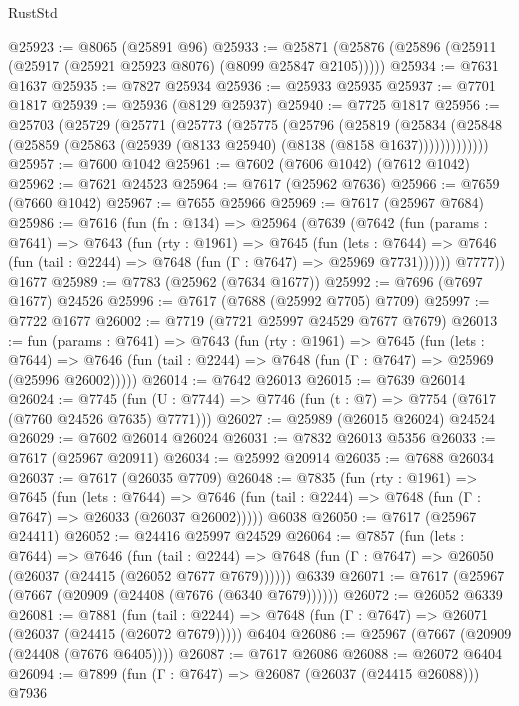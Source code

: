 \begin{lexlean}{RustStd}
\begin{coremodule}
@25923 := @8065 (@25891 @96)
@25933 := @25871 (@25876 (@25896 (@25911 (@25917 (@25921 @25923 @8076) (@8099 @25847 @2105)))))
@25934 := @7631 @1637
@25935 := @7827 @25934
@25936 := @25933 @25935
@25937 := @7701 @1817
@25939 := @25936 (@8129 @25937)
@25940 := @7725 @1817
@25956 := @25703
    (@25729
      (@25771
        (@25773
          (@25775
            (@25796
              (@25819
                (@25834
                  (@25848 (@25859 (@25863 (@25939 (@8133 @25940) (@8138 (@8158 @1637)))))))))))))
@25957 := @7600 @1042
@25961 := @7602 (@7606 @1042) (@7612 @1042)
@25962 := @7621 @24523
@25964 := @7617 (@25962 @7636)
@25966 := @7659 (@7660 @1042)
@25967 := @7655 @25966
@25969 := @7617 (@25967 @7684)
@25986 := @7616
    (fun (fn : @134) =>
    @25964
      (@7639
        (@7642
          (fun (params : @7641) =>
          @7643
            (fun (rty : @1961) =>
            @7645
              (fun (lets : @7644) =>
              @7646 (fun (tail : @2244) => @7648 (fun (Γ : @7647) => @25969 @7731))))))
        @7777))
    @1677
@25989 := @7783 (@25962 (@7634 @1677))
@25992 := @7696 (@7697 @1677) @24526
@25996 := @7617 (@7688 (@25992 @7705) @7709)
@25997 := @7722 @1677
@26002 := @7719 (@7721 @25997 @24529 @7677 @7679)
@26013 := fun (params : @7641) =>
  @7643
    (fun (rty : @1961) =>
    @7645
      (fun (lets : @7644) =>
      @7646 (fun (tail : @2244) => @7648 (fun (Γ : @7647) => @25969 (@25996 @26002)))))
@26014 := @7642 @26013
@26015 := @7639 @26014
@26024 := @7745
    (fun (U : @7744) => @7746 (fun (t : @7) => @7754 (@7617 (@7760 @24526 @7635) @7771)))
@26027 := @25989 (@26015 @26024) @24524
@26029 := @7602 @26014 @26024
@26031 := @7832 @26013 @5356
@26033 := @7617 (@25967 @20911)
@26034 := @25992 @20914
@26035 := @7688 @26034
@26037 := @7617 (@26035 @7709)
@26048 := @7835
    (fun (rty : @1961) =>
    @7645
      (fun (lets : @7644) =>
      @7646 (fun (tail : @2244) => @7648 (fun (Γ : @7647) => @26033 (@26037 @26002)))))
    @6038
@26050 := @7617 (@25967 @24411)
@26052 := @24416 @25997 @24529
@26064 := @7857
    (fun (lets : @7644) =>
    @7646
      (fun (tail : @2244) =>
      @7648 (fun (Γ : @7647) => @26050 (@26037 (@24415 (@26052 @7677 @7679))))))
    @6339
@26071 := @7617 (@25967 (@7667 (@20909 (@24408 (@7676 (@6340 @7679))))))
@26072 := @26052 @6339
@26081 := @7881
    (fun (tail : @2244) => @7648 (fun (Γ : @7647) => @26071 (@26037 (@24415 (@26072 @7679)))))
    @6404
@26086 := @25967 (@7667 (@20909 (@24408 (@7676 @6405))))
@26087 := @7617 @26086
@26088 := @26072 @6404
@26094 := @7899 (fun (Γ : @7647) => @26087 (@26037 (@24415 @26088))) @7936

\end{coremodule}
\end{lexlean}
